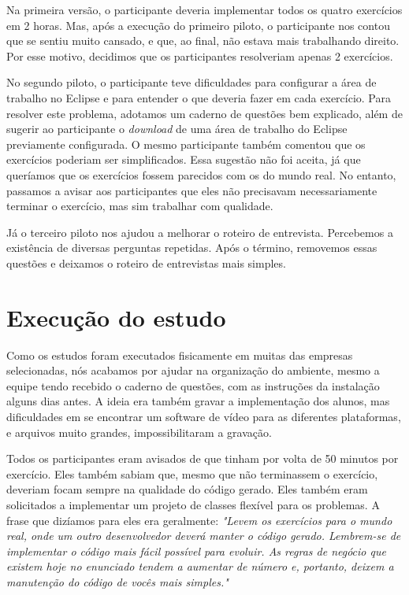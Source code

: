 Na primeira versão, o participante deveria implementar todos os quatro exercícios em 2 horas.
Mas, após a execução do primeiro piloto, o participante nos contou que se sentiu muito cansado, e
que, ao final, não estava mais trabalhando direito. Por esse motivo, decidimos que
os participantes resolveriam apenas 2 exercícios.

No segundo piloto, o participante teve dificuldades para configurar a área de trabalho no Eclipse e
para entender o que deveria fazer em cada exercício. Para resolver este problema, adotamos um 
caderno de questões bem explicado, além de sugerir ao participante o \textit{download} de uma
área de trabalho do Eclipse previamente configurada.
O mesmo participante também comentou que os exercícios poderiam ser simplificados. Essa sugestão
não foi aceita, já que queríamos que os exercícios fossem parecidos com os do mundo real. No entanto,
passamos a avisar aos participantes que eles não precisavam necessariamente terminar o exercício,
mas sim trabalhar com qualidade.

Já o terceiro piloto nos ajudou a melhorar o roteiro de entrevista. Percebemos a existência de diversas perguntas
repetidas. Após o término, removemos essas questões e deixamos o roteiro de entrevistas mais simples.

\section{Execução do estudo}
\label{subsec:particularidades-execucao}

Como os estudos foram executados fisicamente em muitas das empresas selecionadas,
nós acabamos por ajudar na organização do ambiente, mesmo a equipe tendo 
recebido o caderno de questões, com as instruções da instalação
alguns dias antes. A ideia era também gravar a implementação dos alunos,
mas dificuldades em se encontrar um software de vídeo para as diferentes
plataformas, e arquivos muito grandes, impossibilitaram a gravação.

Todos os participantes eram avisados de que tinham por volta de 50 minutos
por exercício. Eles também sabiam que, mesmo que não terminassem o exercício,
deveriam focam sempre na qualidade do código gerado. Eles também eram solicitados
a implementar um projeto de classes flexível para os problemas. A frase que dizíamos para
eles era geralmente: \textit{"Levem os exercícios para o mundo real, onde um outro
desenvolvedor deverá manter o código gerado. Lembrem-se de implementar o código mais fácil possível
para evoluir. As regras de negócio que existem hoje no enunciado tendem a aumentar
de número e, portanto, deixem a manutenção do código de vocês mais simples."}

